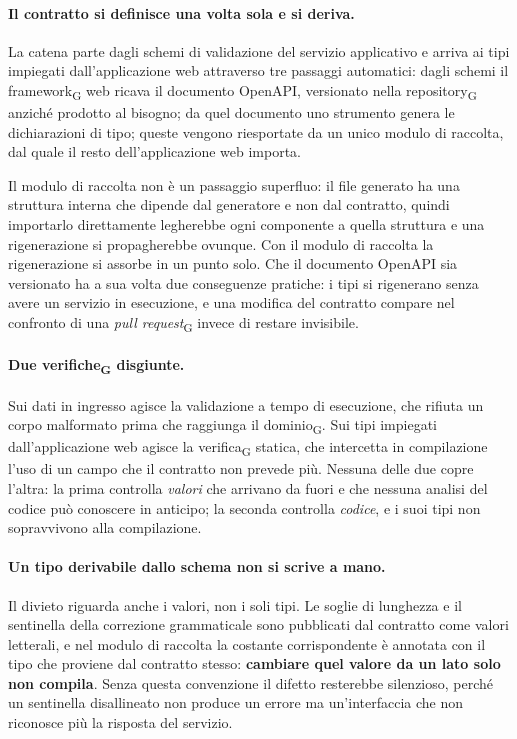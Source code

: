 \documentclass[a4paper, 10pt]{article}
\begin{document}
\paragraph{Il contratto si definisce una volta sola e si deriva.}
La catena parte dagli schemi di validazione del servizio applicativo e arriva ai tipi impiegati dall'applicazione web attraverso tre passaggi automatici: dagli schemi il framework\textsubscript{G} web ricava il documento OpenAPI, versionato nella repository\textsubscript{G} anziché prodotto al bisogno; da quel documento uno strumento genera le dichiarazioni di tipo; queste vengono riesportate da un unico modulo di raccolta, dal quale il resto dell'applicazione web importa.

Il modulo di raccolta non è un passaggio superfluo: il file generato ha una struttura interna che dipende dal generatore e non dal contratto, quindi importarlo direttamente legherebbe ogni componente a quella struttura e una rigenerazione si propagherebbe ovunque. Con il modulo di raccolta la rigenerazione si assorbe in un punto solo. Che il documento OpenAPI sia versionato ha a sua volta due conseguenze pratiche: i tipi si rigenerano senza avere un servizio in esecuzione, e una modifica del contratto compare nel confronto di una \textit{pull request}\textsubscript{G} invece di restare invisibile.

\paragraph{Due verifiche\textsubscript{G} disgiunte.}
Sui dati in ingresso agisce la validazione a tempo di esecuzione, che rifiuta un corpo malformato prima che raggiunga il dominio\textsubscript{G}. Sui tipi impiegati dall'applicazione web agisce la verifica\textsubscript{G} statica, che intercetta in compilazione l'uso di un campo che il contratto non prevede più. Nessuna delle due copre l'altra: la prima controlla \textit{valori} che arrivano da fuori e che nessuna analisi del codice può conoscere in anticipo; la seconda controlla \textit{codice}, e i suoi tipi non sopravvivono alla compilazione.

\paragraph{Un tipo derivabile dallo schema non si scrive a mano.}
Il divieto riguarda anche i valori, non i soli tipi. Le soglie di lunghezza e il sentinella della correzione grammaticale sono pubblicati dal contratto come valori letterali, e nel modulo di raccolta la costante corrispondente è annotata con il tipo che proviene dal contratto stesso: \textbf{cambiare quel valore da un lato solo non compila}. Senza questa convenzione il difetto resterebbe silenzioso, perché un sentinella disallineato non produce un errore ma un'interfaccia che non riconosce più la risposta del servizio.
\end{document}
